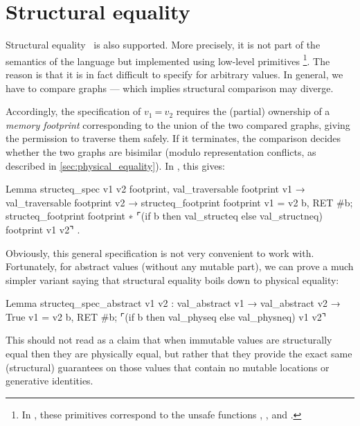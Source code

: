 \section{Structural equality}
\label{sec:structural_equality}

Structural equality~ is also supported.
More precisely, it is not part of the semantics of the language but implemented using low-level primitives%
\footnote{
In \OCaml, these primitives correspond to the unsafe functions , ,  and .
}.
The reason is that it is in fact difficult to specify for arbitrary values.
In general, we have to compare graphs --- which implies structural comparison may diverge.

Accordingly, the specification of $v_1\ \texttt{=}\ v_2$ requires the (partial) ownership of a \emph{memory footprint} corresponding to the union of the two compared graphs, giving the permission to traverse them safely.
If it terminates, the comparison decides whether the two graphs are bisimilar (modulo representation conflicts, as described in \cref{sec:physical_equality}).
In \Iris, this gives:

\begin{coqcode}
Lemma structeq_spec v1 v2 footprint,
  val_traversable footprint v1 →
  val_traversable footprint v2 →
  {{{ structeq_footprint footprint }}}
    v1 = v2
  {{{ b, RET #b;
      structeq_footprint footprint ∗
      ⌜(if b then val_structeq else val_structneq) footprint v1 v2⌝ }}}.
\end{coqcode}

Obviously, this general specification is not very convenient to work with.
Fortunately, for abstract values (without any mutable part), we can prove a much simpler variant saying that structural equality boils down to physical equality:

\begin{coqcode}
Lemma structeq_spec_abstract v1 v2 :
  val_abstract v1 →
  val_abstract v2 →
  {{{ True }}}
    v1 = v2
  {{{ b, RET #b; ⌜(if b then val_physeq else val_physneq) v1 v2⌝ }}}
\end{coqcode}
This should not read as a claim that when immutable values are structurally equal then they are physically equal, but rather that they provide the exact same (structural) guarantees on those values that contain no mutable locations or generative identities.


